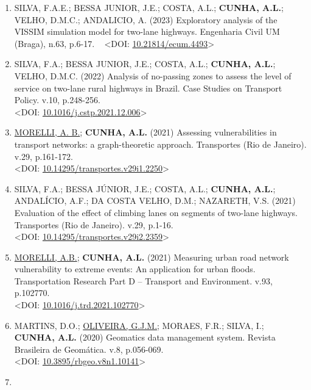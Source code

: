 \documentclass[
  brazilian,
  11pt,
  a4paper,
]{article}
\begin{document}
\begin{enumerate}
  \textless DOI:
  \href{https://doi.org/10.1016/j.geotexmem.2023.05.004}{10.1016/j.geotexmem.2023.05.004}\textgreater{}
\item
  SILVA, F.A.E.; BESSA JUNIOR, J.E.; COSTA, A.L.; \textbf{CUNHA, A.L.};
  VELHO, D.M.C.; ANDALICIO, A. (2023) Exploratory analysis of the VISSIM
  simulation model for two-lane highways. Engenharia Civil UM (Braga),
  n.63, p.6-17. ~ \textless DOI:
  \href{https://doi.org/10.21814/ecum.4493}{10.21814/ecum.4493}\textgreater{}
\item
  SILVA, F.A.; BESSA JUNIOR, J.E.; COSTA, A.L.; \textbf{CUNHA, A.L.};
  VELHO, D.M.C. (2022) Analysis of no-passing zones to assess the level
  of service on two-lane rural highways in Brazil. Case Studies on
  Transport Policy. v.10, p.248-256.\\
  \textless DOI:
  \href{https://doi.org/10.1016/j.cstp.2021.12.006}{10.1016/j.cstp.2021.12.006}\textgreater{}
\item
  \ul{MORELLI, A. B.}; \textbf{CUNHA, A.L.} (2021) Assessing
  vulnerabilities in transport networks: a graph-theoretic approach.
  Transportes (Rio de Janeiro). v.29, p.161-172.\\
  \textless DOI:
  \href{https://doi.org/10.14295/transportes.v29i1.2250}{10.14295/transportes.v29i1.2250}\textgreater{}
\item
  SILVA, F.A.; BESSA JÚNIOR, J.E.; COSTA, A.L.; \textbf{CUNHA, A.L.};
  ANDALÍCIO, A.F.; DA COSTA VELHO, D.M.; NAZARETH, V.S. (2021)
  Evaluation of the effect of climbing lanes on segments of two-lane
  highways. Transportes (Rio de Janeiro). v.29, p.1-16.\\
  \textless DOI:
  \href{https://doi.org/10.14295/transportes.v29i2.2359}{10.14295/transportes.v29i2.2359}\textgreater{}
\item
  \ul{MORELLI, A.B.}; \textbf{CUNHA, A.L.} (2021) Measuring urban road
  network vulnerability to extreme events: An application for urban
  floods. Transportation Research Part D -- Transport and Environment.
  v.93, p.102770.\\
  \textless DOI:
  \href{https://doi.org/10.1016/j.trd.2021.102770}{10.1016/j.trd.2021.102770}\textgreater{}
\item
  MARTINS, D.O.; \ul{OLIVEIRA, G.J.M.}; MORAES, F.R.; SILVA, I.;
  \textbf{CUNHA, A.L.} (2020) Geomatics data management system. Revista
  Brasileira de Geomática. v.8, p.056-069.\\
  \textless DOI:
  \href{https://doi.org/10.3895/rbgeo.v8n1.10141}{10.3895/rbgeo.v8n1.10141}\textgreater{}
\item

\end{enumerate}
\end{document}
